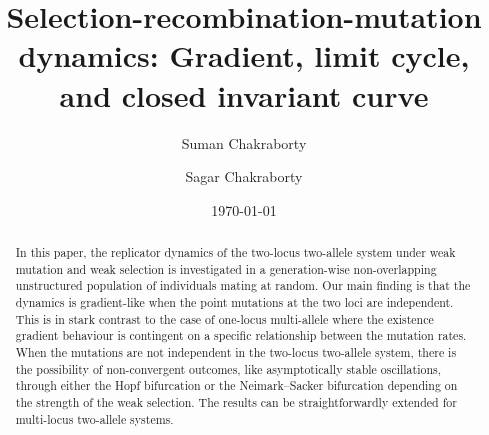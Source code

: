 \documentclass[
 pre,
 aps,
 a4paper,
 english,
 showkeys,
 reprint,
 twocolumn,
 superscriptaddress
]{revtex4}
\begin{document}

\title{Selection-recombination-mutation dynamics: Gradient, limit cycle, and closed invariant curve}%


	\author{Suman Chakraborty}
	\author{Sagar Chakraborty}




\date{\today}%

\begin{abstract}
In this paper, the replicator dynamics of the two-locus two-allele system under weak mutation and weak selection is investigated in a	
generation-wise non-overlapping unstructured population of individuals mating at random. Our main finding is that the dynamics is gradient-like when the point mutations at the two loci are independent. This is in stark contrast to the case of one-locus multi-allele where the existence gradient behaviour is contingent on a specific relationship between the mutation rates. When the mutations are not independent in the two-locus two-allele system, there is the possibility of non-convergent outcomes, like asymptotically stable oscillations, through either the Hopf bifurcation or the Neimark--Sacker bifurcation depending on the strength of the weak selection. The results can be straightforwardly extended for multi-locus two-allele systems.
\end{abstract}

\maketitle
\end{document}
